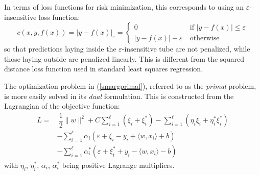 \documentclass[12pt]{report}
\begin{document}
In terms of loss functions for risk minimization, this corresponds to using an $ \varepsilon $-insensitive loss function:
\begin{equation} \label{epsloss}
c(x,y,f(x)) = \vert y - f(x) \vert_{\varepsilon} = \begin{cases}
0 &\ \text{if } \vert y - f(x) \vert \leq \varepsilon \\
\vert y - f(x) \vert - \varepsilon &\ \text{otherwise}
\end{cases}
\end{equation}
so that predictions laying inside the $ \varepsilon $-insensitive tube are not penalized, while those laying outside are penalized linearly. This is different from the squared distance loss function used in standard least squares regression.

The optimization problem in (\ref{smargprimal}), referred to as the \textit{primal} problem, is more easily solved in its \textit{dual} formulation. This is constructed from the Lagrangian of the objective function:
\begin{equation} \label{lagrangian}
\begin{split}
L =& \ \dfrac{1}{2}\| w \|^2 + C\sum_{i=1}^{\ell}(\xi_{i} + \xi_{i}^{*}) - \sum_{i=1}^{\ell}(\eta_{i}\xi_{i} + \eta_{i}^{*}\xi_{i}^{*}) \\
&- \sum_{i=1}^{\ell}\alpha_{i}(\varepsilon + \xi_{i} - y_{i} + \langle w,x_{i} \rangle + b) \\
&- \sum_{i=1}^{\ell}\alpha_{i}^{*}(\varepsilon + \xi_{i}^{*} + y_{i} - \langle w,x_{i} \rangle - b)
\end{split}
\end{equation}
with $ \eta_{i} $, $ \eta_{i}^{*} $, $ \alpha_{i} $, $ \alpha_{i}^{*} $ being positive Lagrange multipliers.
\end{document}
